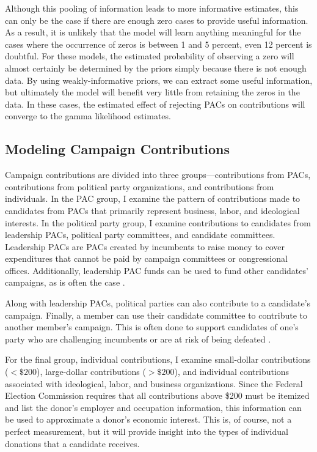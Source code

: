 \documentclass[12pt]{article}
\begin{document}
Although this pooling of information leads to more informative estimates, this can only be the case if there are enough zero cases to provide useful information. As a result, it is unlikely that the model will learn anything meaningful for the cases where the occurrence of zeros is between 1 and 5 percent, even 12 percent is doubtful. For these models, the estimated probability of observing a zero will almost certainly be determined by the priors simply because there is not enough data. By using weakly-informative priors, we can extract some useful information, but ultimately the model will benefit very little from retaining the zeros in the data. In these cases, the estimated effect of rejecting PACs on contributions will converge to the gamma likelihood estimates. 

\subsection{Modeling Campaign Contributions}

Campaign contributions are divided into three groups—contributions from PACs, contributions from political party organizations, and contributions from individuals. In the PAC group, I examine the pattern of contributions made to candidates from PACs that primarily represent business, labor, and ideological interests. In the political party group, I examine contributions to candidates from leadership PACs, political party committees, and candidate committees. Leadership PACs are PACs created by incumbents to raise money to cover expenditures that cannot be paid by campaign committees or congressional offices. Additionally, leadership PAC funds can be used to fund other candidates' campaigns, as is often the case \citep{herrnson2009, lazer2015}.

Along with leadership PACs, political parties can also contribute to a candidate's campaign. Finally, a member can use their candidate committee to contribute to another member's campaign. This is often done to support candidates of one's party who are challenging incumbents or are at risk of being defeated \citep{wilcox1989, lazer2015a}. 

For the final group, individual contributions, I examine small-dollar contributions ($< \$200$), large-dollar contributions ($> \$200$), and individual contributions associated with ideological, labor, and business organizations. Since the Federal Election Commission requires that all contributions above \$200 must be itemized and list the donor's employer and occupation information, this information can be used to approximate a donor's economic interest. This is, of course, not a perfect measurement, but it will provide insight into the types of individual donations that a candidate receives. 
\end{document}
